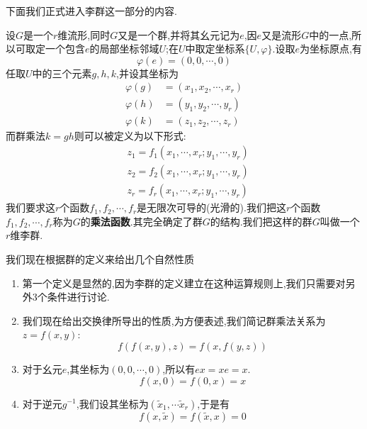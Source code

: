 下面我们正式进入李群这一部分的内容.
\begin{definition}[Lie群的定义]
    设$G$是一个$r$维流形,同时$G$又是一个群,并将其幺元记为$e$,因$e$又是流形$G$中的一点,所以可取定一个包含$e$的局部坐标邻域$U$;在$U$中取定坐标系$\{U,\varphi\}$.设取$e$为坐标原点,有
    \begin{equation}
        \varphi(e)=(0,0,\cdots,0)
    \end{equation}
    任取$U$中的三个元素$g,h,k$,并设其坐标为
    \begin{equation}
        \begin{aligned}
            \varphi(g)&=(x_1,x_2,\cdots,x_r)\\
            \varphi(h)&=(y_1,y_2,\cdots,y_r)\\
            \varphi(k)&=(z_1,z_2,\cdots,z_r)
        \end{aligned}
    \end{equation}
    而群乘法$k=gh$则可以被定义为以下形式:
    \begin{equation}
        \begin{aligned}
            &z_{1}=f_{1}(x_{1},\cdots,x_{r};y_{1},\cdots,y_{r})\\
            &z_{2}=f_{2}(x_{1},\cdots,x_{r};y_{1},\cdots,y_{r})\\
            &z_{r} =f_r(x_1,\cdots,x_r;y_1,\cdots,y_r) 
        \end{aligned}
    \end{equation}
    我们要求这$r$个函数$f_1,f_2,\cdots,f_r$是无限次可导的(光滑的).我们把这$r$个函数$f_1,f_2,\cdots,f_r$称为$G$的\textbf{乘法函数}.其完全确定了群$G$的结构.我们把这样的群$G$叫做一个$r$维李群.
\end{definition}
我们现在根据群的定义来给出几个自然性质
\begin{enumerate}
    \item 第一个定义是显然的,因为李群的定义建立在这种运算规则上,我们只需要对另外3个条件进行讨论.
    \item 我们现在给出交换律所导出的性质,为方便表述,我们简记群乘法关系为$z=f(x,y)$:
    \begin{equation}
        f(f(x,y),z)=f(x,f(y,z))
    \end{equation}
    \item 对于幺元$e$,其坐标为$(0,0,\cdots,0)$,所以有$ex=xe=x$.
    \begin{equation}
        f(x,0)=f(0,x)=x
    \end{equation}
    \item 对于逆元$g^{-1}$,我们设其坐标为$(\tilde{x}_1,\cdots\tilde{x}_r)$,于是有
    \begin{equation}
        f(x,\tilde{x})=f(\tilde{x},x)=0
    \end{equation}
\end{enumerate}
